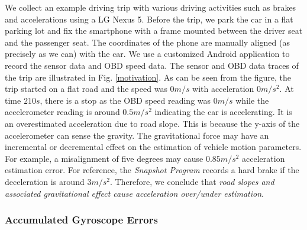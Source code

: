 We collect an example driving trip with various driving activities 
such as brakes and accelerations using a LG Nexus 5.
Before the trip, we park the car in a flat parking lot and fix
the smartphone with a frame mounted between the driver seat
and the passenger seat.
The coordinates of the phone are manually aligned (as precisely as we can) with the car. 
We use a customized Android application to record the sensor data and OBD speed data.
The sensor and OBD data traces of the trip are illustrated in Fig. \ref{motivation}.
As can be seen from the figure, the trip started on a flat road
and the speed was $0m/s$ with acceleration $0m/s^2$. 
At time $210s$, there is a stop as the OBD speed reading was $0m/s$ 
while the accelerometer reading is around $0.5m/s^2$ indicating
the car is accelerating. It is an overestimated acceleration
due to road slope.
This is because the y-axis of the accelerometer can sense the gravity. 
The gravitational force may have an incremental or decremental effect
on the estimation of vehicle motion parameters. 
For example, a misalignment of five degrees may cause $0.85m/s^2$ 
acceleration estimation error.
For reference, the \emph{Snapshot Program} \cite{snapshot} records a hard brake if the deceleration is around $3m/s^2$.
Therefore, we conclude that \emph{road slopes and associated gravitational effect
cause acceleration over/under estimation}. 


\subsubsection{Accumulated Gyroscope Errors}

